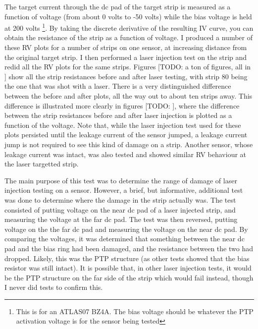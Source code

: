 \documentclass{report}
\begin{document}
            The target current through the dc pad of the target strip is measured as a function of voltage (from about 0 volts to -50 volts) while the bias voltage is held at 200 volts \footnote{This is for an ATLAS07 BZ4A. The bias voltage should be whatever the PTP activation voltage is for the sensor being tested}. By taking the discrete derivative of the resulting IV curve, you can obtain the resistance of the strip as a function of voltage. I produced a number of these RV plots for a number of strips on one sensor, at increasing distance from the original target strip. I then performed a laser injection test on the strip and redid all the RV plots for the same strips. Figures [TODO: a ton of figures, all in 
            ] show all the strip resistances before and after laser testing, with strip 80 being the one that was shot with a laser. There is a very distinguished difference between the before and after plots, all the way out to about ten strips away. This difference is illustrated more clearly in figures [TODO:
            ], where the difference between the strip resistances before and after laser injection is plotted as a function of the voltage. Note that, while the laser injection test used for these plots persisted until the leakage current of the sensor jumped, a leakage current jump is not required to see this kind of damage on a strip. Another sensor, whose leakage current was intact, was also tested and showed similar RV behaviour at the laser targetted strip.

            The main purpose of this test was to determine the range of damage of laser injection testing on a sensor. However, a brief, but informative, additional test was done to determine where the damage in the strip actually was. The test consisted of putting voltage on the near dc pad of a laser injected strip, and measuring the voltage at the far dc pad. The test was then reversed, putting voltage on the the far dc pad and measuring the voltage on the near dc pad. By comparing the voltages, it was determined that something between the near dc pad and the bias ring had been damaged, and the resistance between the two had dropped. Likely, this was the PTP structure (as other tests showed that the bias resistor was still intact). It is possible that, in other laser injection tests, it would be the PTP structure on the far side of the strip which would fail instead, though I never did tests to confirm this.
\end{document}
